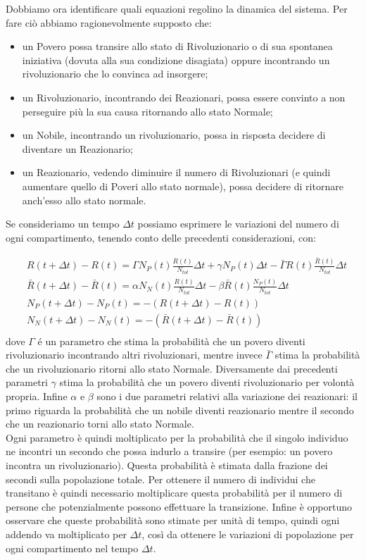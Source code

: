 Dobbiamo ora identificare quali equazioni regolino la dinamica del sistema. Per fare ciò abbiamo ragionevolmente supposto che:
\begin{itemize}
	\item un Povero possa transire allo stato di Rivoluzionario o di sua spontanea iniziativa (dovuta alla sua condizione disagiata) oppure incontrando un rivoluzionario che lo convinca ad insorgere;
	\item un Rivoluzionario, incontrando dei Reazionari, possa essere convinto a non perseguire più la sua causa ritornando allo stato Normale;
	\item un Nobile, incontrando un rivoluzionario, possa in risposta decidere di diventare un Reazionario;
	\item un Reazionario, vedendo diminuire il numero di Rivoluzionari (e quindi aumentare quello di Poveri allo stato normale), possa decidere di ritornare anch'esso allo stato normale.
\end{itemize}
Se consideriamo un tempo $\Delta t$ possiamo esprimere le variazioni del numero di ogni compartimento, tenendo conto delle precedenti considerazioni, con:

\begin{equation}\label{modelloDiscreto}
	\begin{aligned}
		 &R(t+\Delta t)-R(t)=\Gamma N_P(t) \frac{R(t)}{N_{tot}}\Delta t+\gamma N_P(t)\Delta t-\bar{\Gamma}R(t)\frac{\bar{R}(t)}{N_{tot}}\Delta t\\
		&\bar{R}(t+\Delta t)-\bar{R}(t)=\alpha N_N(t)\frac{R(t)}{N_{tot}}\Delta t-\beta \bar{R}(t)\frac{N_P(t)}{N_{tot}}\Delta t\\
		&N_P(t+\Delta t)-N_P(t)=-(R(t+\Delta t)-R(t))\\
		&N_N(t+\Delta t)-N_N(t)=-(\bar{R}(t+\Delta t)-\bar{R}(t))\\
	\end{aligned}     
\end{equation}	
dove $ \Gamma $ é un parametro che stima la probabilità che un povero diventi rivoluzionario incontrando altri rivoluzionari, mentre invece $ \bar{\Gamma} $ stima la probabilità che un rivoluzionario ritorni allo stato Normale.  Diversamente dai precedenti parametri $\gamma$ stima la probabilità che un povero diventi rivoluzionario per volontà propria. Infine $ \alpha $ e $ \beta $ sono i due parametri relativi alla variazione dei reazionari: il primo riguarda la probabilità che un nobile diventi reazionario mentre il secondo che un reazionario torni allo stato Normale. \\
Ogni parametro è quindi moltiplicato per la probabilità che il singolo individuo ne incontri un secondo che possa indurlo a transire (per esempio: un povero incontra un rivoluzionario). Questa probabilità è stimata dalla frazione dei secondi sulla popolazione totale. Per ottenere il numero di individui che transitano è quindi necessario moltiplicare questa probabilità per il numero di persone che potenzialmente possono effettuare la transizione. Infine è opportuno osservare che queste probabilità sono stimate per unità di tempo, quindi ogni addendo va moltiplicato per $\Delta t$, così da ottenere le variazioni di popolazione per ogni compartimento nel tempo $\Delta t$.\\


